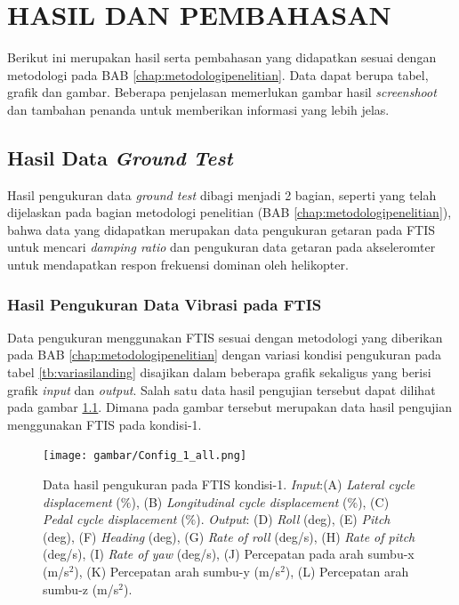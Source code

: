 \chapter{HASIL DAN PEMBAHASAN}
\label{chap:hasil dan pembahasan}

\thispagestyle{newchap}
Berikut ini merupakan hasil serta pembahasan yang didapatkan sesuai dengan metodologi pada BAB \ref{chap:metodologipenelitian}. Data dapat berupa tabel, grafik dan gambar. Beberapa penjelasan memerlukan gambar hasil \textit{screenshoot} dan tambahan penanda untuk memberikan informasi yang lebih jelas.

\section{Hasil Data \textit{Ground Test}}
Hasil pengukuran data \textit{ground test} dibagi menjadi 2 bagian, seperti yang telah dijelaskan pada bagian metodologi penelitian (BAB \ref{chap:metodologipenelitian}), bahwa data yang didapatkan merupakan data pengukuran getaran pada FTIS untuk mencari \textit{damping ratio} dan pengukuran data getaran pada akseleromter untuk mendapatkan respon frekuensi dominan oleh helikopter.

\subsection{Hasil Pengukuran Data Vibrasi pada FTIS}

Data pengukuran menggunakan FTIS sesuai dengan metodologi yang diberikan pada BAB \ref{chap:metodologipenelitian} dengan variasi kondisi pengukuran pada tabel \ref{tb:variasilanding} disajikan dalam beberapa grafik sekaligus yang berisi grafik \textit{input} dan \textit{output}. Salah satu data hasil pengujian tersebut dapat dilihat pada gambar \ref{fig:condition_1}. Dimana pada gambar tersebut merupakan data hasil pengujian menggunakan FTIS pada kondisi-1.

\begin{figure}[H]
	\centering
	\texttt{[image: gambar/Config\_1\_all.png]}
	\caption{Data hasil pengukuran pada FTIS kondisi-1. \textit{Input}:(A) \textit{Lateral cycle displacement} ($\%$), (B) \textit{Longitudinal cycle displacement} ($\%$), (C) \textit{Pedal cycle displacement} ($\%$). \textit{Output}: (D) \textit{Roll} (deg), (E) \textit{Pitch} (deg), (F) \textit{Heading} (deg), (G) \textit{Rate of roll} (deg/s), (H) \textit{Rate of pitch} (deg/s), (I) \textit{Rate of yaw} (deg/s), (J) Percepatan pada arah sumbu-x (m/s$^2$), (K) Percepatan arah sumbu-y (m/s$^2$), (L) Percepatan arah sumbu-z (m/s$^2$).}
	\label{fig:condition_1}
\end{figure}


